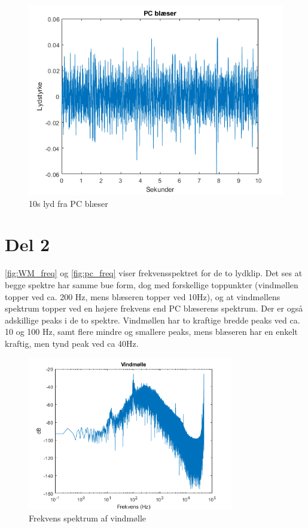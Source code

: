 \begin{figure}[h]
\centering
\includegraphics[width=\textwidth]{figures/pcFan_10s}
\caption{10s lyd fra PC blæser}%
\label{fig:pc_10s}
\end{figure}

\newpage

\section{Del 2}

\autoref{fig:WM_freq} og \autoref{fig:pc_freq} viser frekvensspektret for de to lydklip. Det ses at begge spektre har samme bue form, dog med forskellige toppunkter (vindmøllen topper ved ca. 200 Hz, mens blæseren topper ved 10Hz), og at vindmøllens spektrum topper ved en højere frekvens end PC blæserens spektrum. Der er også adskillige peaks i de to spektre. Vindmøllen har to kraftige bredde peaks ved ca. 10 og 100 Hz, samt flere mindre og smallere peaks, mens blæseren har en enkelt kraftig, men tynd peak ved ca 40Hz. 

\begin{figure}[h]
\centering
\includegraphics[width=0.8\textwidth]{"figures/Windmill_frekvens"}
\caption{Frekvens spektrum af vindmølle}
\label{fig:WM_freq}
\end{figure}

